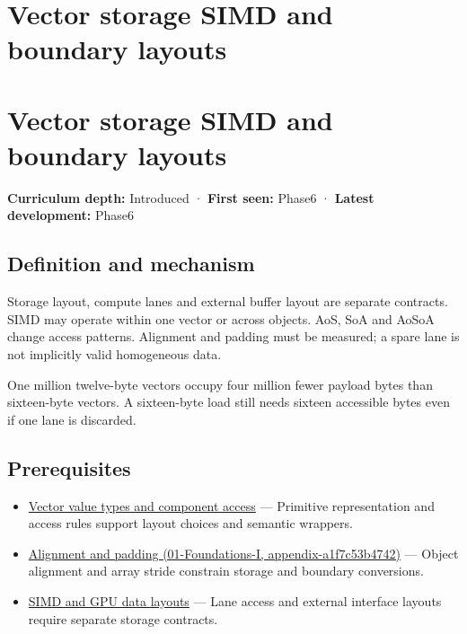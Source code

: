 \hypertarget{appendix-26bf6bf2fb8b}{}
\section*{Vector storage SIMD and boundary layouts}
\section{Vector storage SIMD and boundary layouts}\label{appendix-26bf6bf2fb8b-vector-storage-simd-and-boundary-layouts}

\textbf{Curriculum depth:} Introduced · \textbf{First seen:} Phase6 · \textbf{Latest development:} Phase6

\subsection{Definition and mechanism}\label{appendix-26bf6bf2fb8b-definition-and-mechanism}

Storage layout, compute lanes and external buffer layout are separate contracts. SIMD may operate within one vector or across objects. AoS, SoA and AoSoA change access patterns. Alignment and padding must be measured; a spare lane is not implicitly valid homogeneous data.

One million twelve-byte vectors occupy four million fewer payload bytes than sixteen-byte vectors. A sixteen-byte load still needs sixteen accessible bytes even if one lane is discarded.

\subsection{Prerequisites}\label{appendix-26bf6bf2fb8b-prerequisites}

\begin{itemize}
\tightlist
\item
  \hyperref[appendix-37a39984ba66]{Vector value types and component access} --- Primitive representation and access rules support layout choices and semantic wrappers.
\item
  \href{../01-Foundations-I/main.pdf\#nameddest=appendix-a1f7c53b4742}{Alignment and padding (01-Foundations-I, appendix-a1f7c53b4742)} --- Object alignment and array stride constrain storage and boundary conversions.
\item
  \hyperref[appendix-3c7b1a56de01]{SIMD and GPU data layouts} --- Lane access and external interface layouts require separate storage contracts.
\end{itemize}

